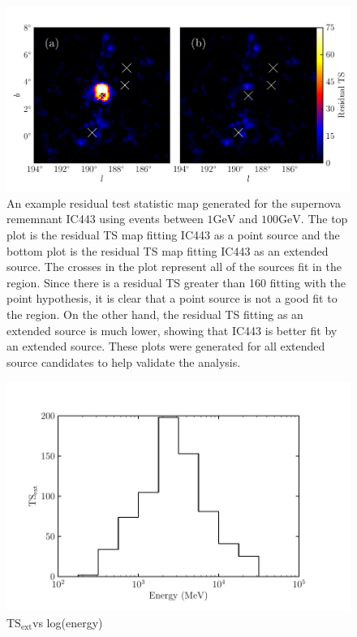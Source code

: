 \documentclass[preprint]{aastex}
\newcommand{\gev}{\text{GeV}}
\newcommand{\tsext}{\ensuremath{\text{TS}_\text{ext}}}
\begin{document}
\begin{figure}
  \begin{center}
  \includegraphics{ic443_plots/res_tsmap_ic443.pdf}

  \caption{An example residual test statistic map generated for the
  supernova rememnant IC443 using events between $1\gev$ and
  $100\gev$.  The top plot is the residual TS map fitting IC443
  as a point source and the bottom plot is the residual TS map fitting
  IC443 as an extended source. The crosses in the plot represent all of
  the sources fit in the region. Since there is a residual TS greater
  than 160 fitting with the point hypothesis, it is clear that a point
  source is not a good fit to the region. On the other hand,
  the residual TS fitting as an extended source is much lower, showing
  that IC443 is better fit by an extended source. These plots were generated
  for all extended source candidates to help validate the analysis.}
  \label{res_tsmaps}
  \end{center}
\end{figure}

\clearpage
\begin{figure}
  \begin{center}
    \includegraphics{ic443_plots/ic443_ts_ext_vs_energy.pdf}
    \caption{\tsext vs log(energy)}
    \label{counts_slice}
  \end{center}
\end{figure}
\end{document}
